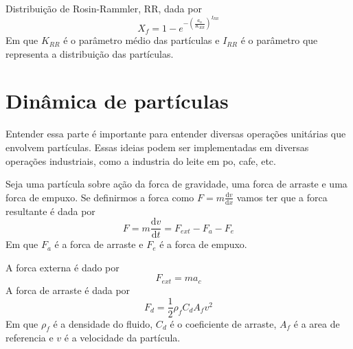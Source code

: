 Distribuição de Rosin-Rammler, RR, dada por
\begin{equation}
    X_f = 1 - e^{-\left(\frac{a_n}{K_{RR}}\right)^{I_{RR}}}
\end{equation}
Em que \(K_{RR}\) é o parâmetro médio das partículas e \(I_{RR}\) é o parâmetro que representa a
distribuição das partículas.\par


\section{Dinâmica de partículas}
Entender essa parte é importante para entender diversas operações unitárias que envolvem partículas.
Essas ideias podem ser implementadas em diversas operações industriais, como a industria do leite em
po,  cafe, etc. \par

Seja uma partícula sobre ação da forca de gravidade, uma forca de arraste e uma forca de empuxo. Se
definirmos a forca como \(F = m \frac{\mathrm{d}v }{\mathrm{d}x }\)  vamos ter que a forca
resultante é dada por
\begin{equation}\label{eq: forca resultante}
    F = m \frac{\mathrm{d}v }{\mathrm{d}t } = F_{ext} - F_a - F_e
\end{equation}
Em que \(F_a\) é a forca de arraste e \(F_e\) é a forca de empuxo. \par A forca externa é dado por 
\begin{equation}\label{eq: forca externa}
    F_{ext} = m a_c
\end{equation}
A forca de arraste é dada por
\begin{equation}\label{eq:forca de arraste}
    F_d = \frac{1}{2} \rho_f C_d A_f v^2
\end{equation}
Em que \(\rho_f\) é a densidade do fluido, \(C_d\) é o coeficiente de arraste, \(A_f\) é a area de
referencia e \(v\) é a velocidade da partícula. \par

